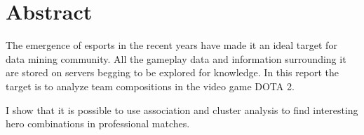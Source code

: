 \documentclass[result.tex]{subfiles}
\begin{document}
\section*{\centering Abstract}

The emergence of esports in the recent years have made it an ideal target for data mining community. All the gameplay data and information surrounding it are stored on servers begging to be explored for knowledge. In this report the target is to analyze team compositions in the video game DOTA 2.

I show that it is possible to use association and cluster analysis to find interesting hero combinations in professional matches.
\end{document}
